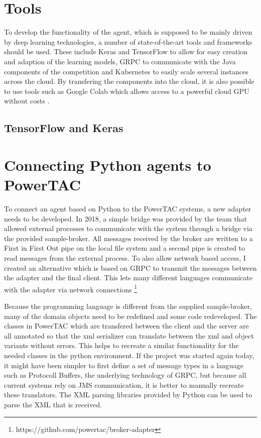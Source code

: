 \section{Tools}

To develop the functionality of the agent, which is supposed to be mainly driven by deep learning technologies, a number of state-of-the-art tools and frameworks should be used. These include Keras and TensorFlow to allow for easy creation and adaption of the learning models, \ac {GRPC} to communicate with the Java components of the competition and Kubernetes to easily scale several instances across the cloud. By transfering the components into the cloud, it is also possible to use tools such as Google Colab which allows access to a powerful cloud \ac {GPU} without costs 
\citep[]{GoogleColabOnline2018} .%


\subsection{TensorFlow and Keras}
\section{Connecting Python agents to PowerTAC}

To connect an agent based on Python to the \ac{PowerTAC} systems, a new adapter needs to be developed. In 2018, a simple bridge was provided by the team that allowed external processes to communicate with the system through a bridge via the provided sample-broker. All messages received by the broker are written to a First in First Out pipe on the local file system and a second pipe is created to read messages from the external process. To also allow network based access, I created an alternative which is based on \ac{GRPC} to transmit the messages between the adapter and the final client. This lets many different languages communicate with the adapter via network connections \footnote{https://github.com/powertac/broker-adapter} 

Because the programming language is different from the supplied sample-broker, many of the domain objects need to be redefined and some code redeveloped. The classes in \ac {PowerTAC} which are transfered between the client and the server are all annotated so that the xml serializer can translate between the xml and object variants without errors. This helps to recreate a similar functionality for the needed classes in the python environment. If the project was started again today, it might have been simpler to first define a set of message types in a language such as Protocoll Buffers, the underlying technology of \ac {GRPC}, but because all current systems rely on \ac {JMS} communication, it is better to manually recreate these translators. The \ac {XML} parsing libraries provided by Python can be used to parse the \ac {XML} that is received.
